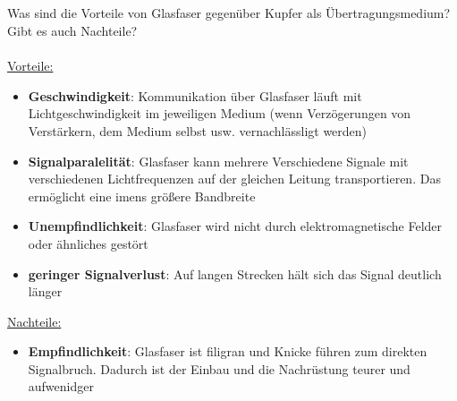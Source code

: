 \documentclass[a4paper]{article}
\begin{document}
\setcounter{section}{3}
\subsection{}
Was sind die Vorteile von Glasfaser gegenüber Kupfer als Übertragungsmedium? Gibt es auch Nachteile?\\\\
\underline{Vorteile:}
\begin{itemize}
    \item \textbf{Geschwindigkeit}: Kommunikation über Glasfaser läuft mit Lichtgeschwindigkeit im jeweiligen Medium (wenn Verzögerungen von Verstärkern, dem Medium selbst usw. vernachlässligt werden)
    \item \textbf{Signalparalelität}: Glasfaser kann mehrere Verschiedene Signale mit verschiedenen Lichtfrequenzen auf der gleichen Leitung transportieren. Das ermöglicht eine imens größere Bandbreite
    \item \textbf{Unempfindlichkeit}: Glasfaser wird nicht durch elektromagnetische Felder oder ähnliches gestört
    \item \textbf{geringer Signalverlust}: Auf langen Strecken hält sich das Signal deutlich länger
\end{itemize}
\underline{Nachteile:}
\begin{itemize}
    \item \textbf{Empfindlichkeit}: Glasfaser ist filigran und Knicke führen zum direkten Signalbruch. Dadurch ist der Einbau und die Nachrüstung teurer und aufwenidger
\end{itemize}
\end{document}
